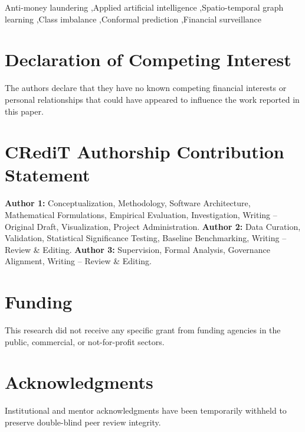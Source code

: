 \documentclass[a4paper,fleqn]{cas-dc}
\begin{document}
\begin{keywords}
Anti-money laundering \sep Applied artificial intelligence \sep Spatio-temporal graph learning \sep Class imbalance \sep Conformal prediction \sep Financial surveillance
\end{keywords}

\maketitle
\linenumbers










\FloatBarrier

\section*{Declaration of Competing Interest}
The authors declare that they have no known competing financial interests or personal relationships that could have appeared to influence the work reported in this paper.

\section*{CRediT Authorship Contribution Statement}
\textbf{Author 1:} Conceptualization, Methodology, Software Architecture, Mathematical Formulations, Empirical Evaluation, Investigation, Writing -- Original Draft, Visualization, Project Administration. \textbf{Author 2:} Data Curation, Validation, Statistical Significance Testing, Baseline Benchmarking, Writing -- Review \& Editing. \textbf{Author 3:} Supervision, Formal Analysis, Governance Alignment, Writing -- Review \& Editing.

\section*{Funding}
This research did not receive any specific grant from funding agencies in the public, commercial, or not-for-profit sectors.

\section*{Acknowledgments}
Institutional and mentor acknowledgments have been temporarily withheld to preserve double-blind peer review integrity.
\end{document}

